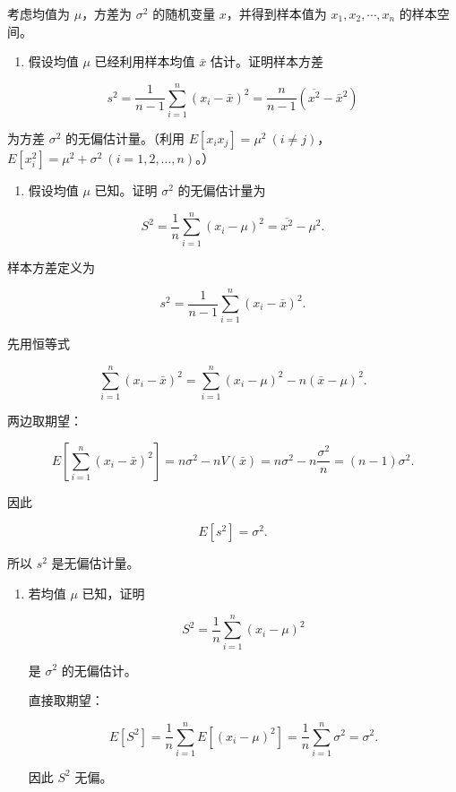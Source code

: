 \begin{question}
考虑均值为 \(\mu\)，方差为 \(\sigma^2\) 的随机变量 \(x\)，并得到样本值为
\(x_1,x_2,\cdots,x_n\) 的样本空间。

\begin{enumerate}
\item
  假设均值 \(\mu\) 已经利用样本均值 \(\bar x\) 估计。证明样本方差
\end{enumerate}

\[
s^2=\frac{1}{n-1}\sum_{i=1}^{n}(x_i-\bar x)^2=\frac{n}{n-1}(\overline{x^2}-\bar x^2)
\]

为方差 \(\sigma^2\) 的无偏估计量。（利用
\(E[x_ix_j]=\mu^2\ (i\ne j)\)，\(E[x_i^2]=\mu^2+\sigma^2\ (i=1,2,\ldots,n)\)。）

\begin{enumerate}[start=2]
\item
  假设均值 \(\mu\) 已知。证明 \(\sigma^2\) 的无偏估计量为
\end{enumerate}

\[
S^2=\frac1n\sum_{i=1}^{n}(x_i-\mu)^2=\overline{x^2}-\mu^2.
\]
\begin{solution}
样本方差定义为

\[
s^2=\frac1{n-1}\sum_{i=1}^n (x_i-\bar x)^2.
\]

先用恒等式

\[
\sum_{i=1}^n (x_i-\bar x)^2=\sum_{i=1}^n (x_i-\mu)^2-n(\bar x-\mu)^2.
\]

两边取期望：

\[
E\left[\sum_{i=1}^n (x_i-\bar x)^2\right]
= n\sigma^2 - nV(\bar x)
= n\sigma^2 - n\frac{\sigma^2}{n}
= (n-1)\sigma^2.
\]

因此

\[
E[s^2]=\sigma^2.
\]

所以 \(s^2\) 是无偏估计量。

\begin{enumerate}[start=2]
\item 若均值 \(\mu\) 已知，证明

\[
S^2=\frac1n\sum_{i=1}^n (x_i-\mu)^2
\]

是 \(\sigma^2\) 的无偏估计。

直接取期望：

\[
E[S^2]=\frac1n\sum_{i=1}^n E[(x_i-\mu)^2]=\frac1n\sum_{i=1}^n \sigma^2=\sigma^2.
\]

因此 \(S^2\) 无偏。
\end{enumerate}
\end{solution}
\end{question}




